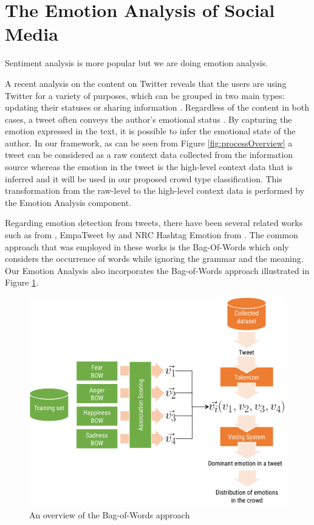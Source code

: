 \section{The Emotion Analysis of Social Media}
Sentiment analysis is more popular but we are doing emotion analysis.

A recent analysis on the content on Twitter reveals that the users are using Twitter for a variety of purposes, which can be grouped in two main types: updating their statuses or sharing information \citep{java2007we}. Regardless of the content in both cases, a tweet often conveys the author's emotional status \citep{bollen2009modeling}. By capturing the emotion expressed in the text, it is possible to infer the emotional state of the author. In our framework, as can be seen from Figure \ref{fig:processOverview} a tweet can be considered as a raw context data collected from the information source whereas the emotion in the tweet is the high-level context data that is inferred and it will be used in our proposed crowd type classification. This transformation from the raw-level to the high-level context data is performed by the Emotion Analysis component. 

Regarding emotion detection from tweets, there have been several related works such as from \citet{bollen2009modeling}, EmpaTweet by \citet{roberts2012empatweet} and NRC Hashtag Emotion from \citet{mohammad2014using}. The common approach that was employed in these works is the Bag-Of-Words which only considers the occurrence of words while ignoring the grammar and the meaning. Our Emotion Analysis also incorporates the Bag-of-Words approach illustrated in Figure \ref{fig:bagOfWord}.

\begin{figure}[htb!] 
\centering    
\includegraphics[width=1.0\textwidth]{BagOfWord}
\caption{An overview of the Bag-of-Words approach}
\label{fig:bagOfWord}
\end{figure}

